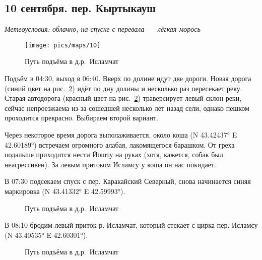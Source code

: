 \subsection{10 сентября. пер. Кыртыкауш}
\textit{Метеоусловия: облачно, на спуске с перевала~--- лёгкая морось}

\begin{figure}[h!]
	\centering
	\texttt{[image: pics/maps/10]}
	\label{fig:10}
\end{figure}

\begin{figure}[h!]
	\centering
	\caption{Путь подъёма в д.р.~Исламчат}
	\label{fig:routeToKyrtyk}
\end{figure}


Подъём в 04:30, выход в 06:40. Вверх по долине идут две дороги. Новая дорога (синий цвет на рис.~\ref{fig:routeToKyrtyk}) идёт по дну долины и несколько раз пересекает реку. Старая автодорога (красный цвет на рис.~\ref{fig:routeToKyrtyk}) траверсирует левый склон реки, сейчас непроезжаема из-за сошедшей несколько лет назад сели, однако пешком проходится прекрасно. Выбираем второй вариант. 

Через некоторое время дорога выполаживается, около коша (N 43.42437° E 42.60189°) встречаем огромного алабая, лакомящегося барашком. От греха подальше приходится нести Йошту на руках (хотя, кажется, собак был неагрессивен). За левым притоком Исламсу у коша он нас покидает.

В 07:30 подсекаем спуск с пер. Каракайский Северный, снова начинается синяя маркировка (N 43.41332° E 42.59993°).

\begin{figure}[h!]
	\centering
	\caption{Путь подъёма в д.р.~Исламчат}
	\label{fig:routeToKyrtyk2}
\end{figure}

В 08:10 бродим левый приток р. Исламчат, который стекает с цирка пер. Исламсу (N 43.40535° E 42.60301°).

\begin{figure}[h!]
	\centering
	\caption{Путь подъёма в д.р.~Исламчат}
	\label{fig:routeToKyrtyk3}
\end{figure}

